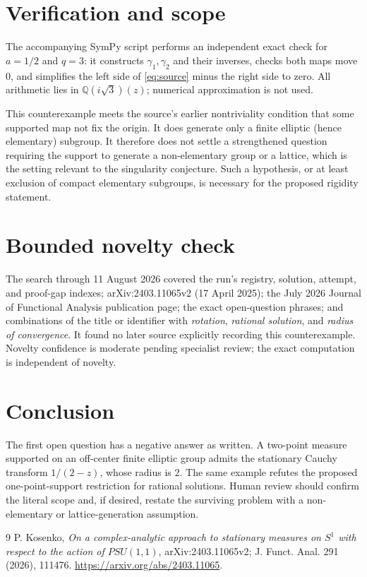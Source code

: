 \documentclass[11pt]{article}
\begin{document}
\section{Verification and scope}

The accompanying SymPy script performs an independent exact check for
$a=1/2$ and $q=3$: it constructs $\gamma_1,\gamma_2$ and their inverses,
checks both maps move $0$, and simplifies the left side of
\eqref{eq:source} minus the right side to zero.  All arithmetic lies in
$\mathbb Q(i\sqrt3)(z)$; numerical approximation is not used.

This counterexample meets the source's earlier nontriviality condition that
some supported map not fix the origin.  It does generate only a finite
elliptic (hence elementary) subgroup.  It therefore does not settle a
strengthened question requiring the support to generate a non-elementary
group or a lattice, which is the setting relevant to the singularity
conjecture.  Such a hypothesis, or at least exclusion of compact elementary
subgroups, is necessary for the proposed rigidity statement.

\section{Bounded novelty check}

The search through 11 August 2026 covered the run's registry, solution,
attempt, and proof-gap indexes; arXiv:2403.11065v2 (17 April 2025); the July
2026 Journal of Functional Analysis publication page; the exact open-question
phrases; and combinations of the title or identifier with \emph{rotation},
\emph{rational solution}, and \emph{radius of convergence}.  It found no
later source explicitly recording this counterexample.  Novelty confidence is
moderate pending specialist review; the exact computation is independent of
novelty.

\section{Conclusion}

The first open question has a negative answer as written.  A two-point measure
supported on an off-center finite elliptic group admits the stationary Cauchy
transform $1/(2-z)$, whose radius is $2$.  The same example refutes the
proposed one-point-support restriction for rational solutions.  Human review
should confirm the literal scope and, if desired, restate the surviving
problem with a non-elementary or lattice-generation assumption.

\begin{thebibliography}{9}
P. Kosenko,
\emph{On a complex-analytic approach to stationary measures on $S^1$ with
respect to the action of $PSU(1,1)$},
arXiv:2403.11065v2; J. Funct. Anal. 291 (2026), 111476.
\url{https://arxiv.org/abs/2403.11065}.
\end{thebibliography}
\end{document}
